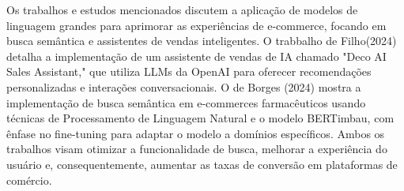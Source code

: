 Os trabalhos e estudos mencionados discutem a aplicação de modelos de linguagem grandes  para aprimorar as experiências de e-commerce, 
focando em busca semântica e assistentes de vendas inteligentes. O trabbalho de Filho(2024) detalha a implementação de 
um assistente de vendas de IA chamado "Deco AI Sales Assistant," que utiliza LLMs da OpenAI para
oferecer recomendações personalizadas e interações conversacionais. O de Borges (2024) mostra a implementação de busca 
semântica em e-commerces farmacêuticos usando técnicas de Processamento de Linguagem Natural  e o modelo BERTimbau, 
com ênfase no fine-tuning para adaptar o modelo a domínios específicos. Ambos os trabalhos visam otimizar 
a funcionalidade de busca, melhorar a experiência do usuário e, consequentemente, aumentar as taxas de conversão em 
plataformas de comércio.



